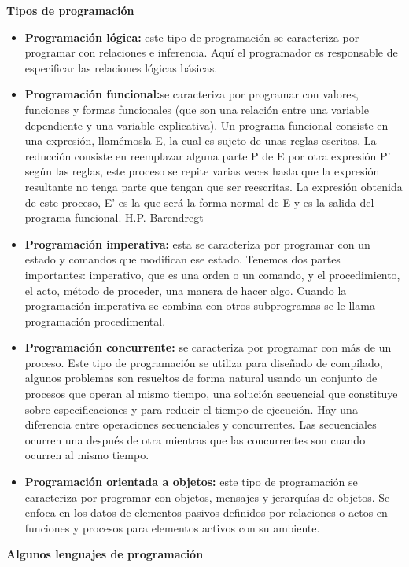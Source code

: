 \documentclass[11pt, letterpaper, spanish]{article}
\begin{document}
{   
   \textbf{Tipos de programación}
   \begin{itemize}
       \item{\textbf{Programación lógica:} este tipo de programación se caracteriza por programar con relaciones e inferencia. Aquí el programador es responsable de especificar las relaciones lógicas básicas.}
       \item{\textbf{Programación funcional:}se caracteriza por programar con valores, funciones y formas funcionales (que son una relación entre una variable dependiente y una variable explicativa). Un programa funcional consiste en una expresión, llamémosla E, la cual es sujeto de unas reglas escritas. La reducción consiste en reemplazar alguna parte P de E por otra expresión P' según las reglas, este proceso se repite varias veces hasta que la expresión resultante no tenga parte que tengan que ser reescritas. La expresión obtenida de este proceso, E' es la que será la forma normal de E y es la salida del programa funcional.-H.P. Barendregt}
       \item{\textbf{Programación imperativa:} esta se caracteriza por programar con un estado y comandos que modifican ese estado. Tenemos dos partes importantes: imperativo, que es una orden o un comando, y el procedimiento, el acto, método de proceder, una manera de hacer algo. Cuando la programación imperativa se combina con otros subprogramas se le llama programación procedimental.}
       \item{\textbf{Programación concurrente:} se caracteriza por programar con más de un proceso. Este tipo de programación se utiliza para diseñado de compilado, algunos problemas son resueltos de forma natural usando un conjunto de procesos que operan al mismo tiempo, una solución secuencial que constituye sobre especificaciones y para reducir el tiempo de ejecución. Hay una diferencia entre operaciones secuenciales y concurrentes. Las secuenciales ocurren una después de otra mientras que las concurrentes son cuando ocurren al mismo tiempo.}
       \item{\textbf{Programación orientada a objetos:} este tipo de programación se caracteriza por programar con objetos, mensajes y jerarquías de objetos. Se enfoca en los datos de elementos pasivos definidos por relaciones o actos en funciones y procesos para elementos activos con su ambiente.}
   \end{itemize}
     \textbf{Algunos lenguajes de programación}
   \begin{itemize}

\end{itemize}}
\end{document}
